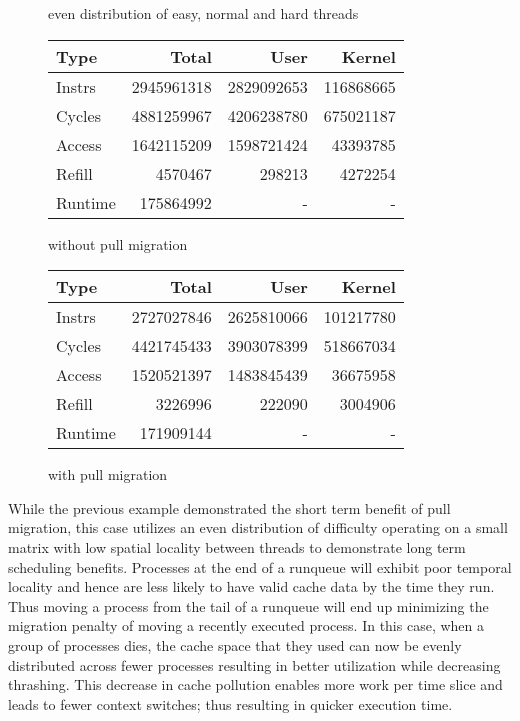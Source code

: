 \documentclass[11pt]{article}
\begin{document}
\begin{figure*}[!h]
	\caption{even distribution of easy, normal and hard threads}
	\centering
	\begin{subtable}[b]{.48\linewidth}
		\centering                 
		\begin{tabular}{ l|rrr }
			Type    & Total      & User       & Kernel    \\
			\hline
			Instrs  & 2945961318 & 2829092653 & 116868665 \\ 
			Cycles  & 4881259967 & 4206238780 & 675021187 \\ 
			Access  & 1642115209 & 1598721424 & 43393785  \\ 
			Refill  & 4570467    & 298213     & 4272254   \\ 
			Runtime & 175864992  & -          & -         \\
			\hline
		\end{tabular}
		\caption{without pull migration}    
	\end{subtable}
	\hfill
	\begin{subtable}[b]{.48\linewidth}
		\centering
		\begin{tabular}{ l|rrr }
			Type    & Total      & User       & Kernel    \\
			\hline
			Instrs  & 2727027846 & 2625810066 & 101217780 \\ 
			Cycles  & 4421745433 & 3903078399 & 518667034 \\ 
			Access  & 1520521397 & 1483845439 & 36675958  \\ 
			Refill  & 3226996    & 222090     & 3004906   \\ 
			Runtime & 171909144  & -          & -         \\
			\hline
		\end{tabular}
		\caption{with pull migration}
	\end{subtable}
\end{figure*}

While the previous example demonstrated the short term benefit of pull migration, this case utilizes an even distribution of difficulty operating on a small matrix with low spatial locality between threads to demonstrate long term scheduling benefits.  Processes at the end of a runqueue will exhibit poor temporal locality and hence are less likely to have valid cache data by the time they run.  Thus moving a process from the tail of a runqueue will end up minimizing the migration penalty of moving a recently executed process.  In this case, when a group of processes dies, the cache space that they used can now be evenly distributed across fewer processes resulting in better utilization while decreasing thrashing.  This decrease in cache pollution enables more work per time slice and leads to fewer context switches; thus resulting in quicker execution time.
\end{document}
